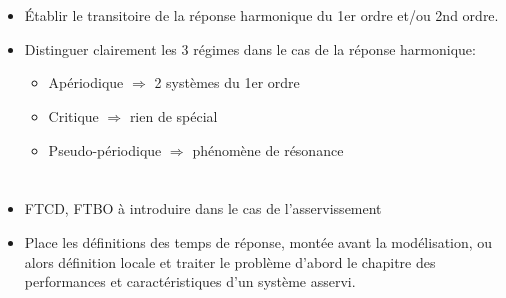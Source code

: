 \section*{}
\begin{itemize}
\item \'Etablir le transitoire de la réponse harmonique du 1er ordre et/ou 
      2nd ordre.
\item Distinguer clairement les 3 régimes dans le cas de la réponse harmonique:
    \begin{itemize}
        \item Apériodique       $\Rightarrow$ 2 systèmes du 1er ordre
        \item Critique          $\Rightarrow$ rien de spécial
        \item Pseudo-périodique $\Rightarrow$ phénomène de résonance
    \end{itemize}
\end{itemize}
\section*{}
\begin{itemize}
    \item FTCD, FTBO à introduire dans le cas de l'asservissement
    \item Place les définitions des temps de réponse, montée avant la 
          modélisation, ou alors définition locale et traiter le problème 
          d'abord le chapitre des performances et caractéristiques d'un 
          système asservi.
\end{itemize}
